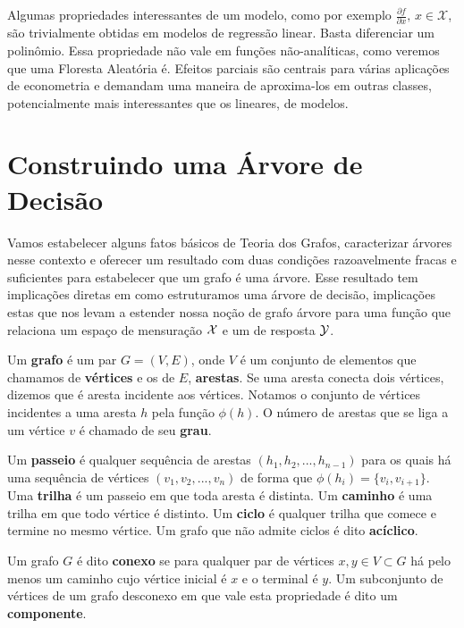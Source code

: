 Algumas propriedades interessantes de um modelo, como por exemplo $\frac{\partial f}{\partial x}, \, x \in \mathcal{X}$, são trivialmente obtidas em modelos de regressão linear. Basta diferenciar um polinômio. Essa propriedade não vale em funções não-analíticas, como veremos que uma Floresta Aleatória é. Efeitos parciais são centrais para várias aplicações de econometria e demandam uma maneira de aproxima-los em outras classes, potencialmente mais interessantes que os lineares, de modelos.

\section{Construindo uma Árvore de Decisão}

Vamos estabelecer alguns fatos básicos de Teoria dos Grafos, caracterizar árvores nesse contexto e oferecer um resultado com duas condições razoavelmente fracas e suficientes para estabelecer que um grafo é uma árvore. Esse resultado tem implicações diretas em como estruturamos uma árvore de decisão, implicações estas que nos levam a estender nossa noção de grafo árvore para uma função que relaciona um espaço de mensuração $\mathcal{X}$ e um de resposta $\mathcal{Y}$.

\begin{defi}
Um \textbf{grafo} é um par $G = (V, E)$, onde $V$ é um conjunto de elementos que chamamos de \textbf{vértices} e os de $E$, \textbf{arestas}. Se uma aresta conecta dois vértices, dizemos que é aresta incidente aos vértices. Notamos o conjunto de vértices incidentes a uma aresta $h$ pela função $\phi(h)$. O número de arestas que se liga a um vértice $v$ é chamado de seu \textbf{grau}.
\end{defi}

\begin{defi}
Um \textbf{passeio} é qualquer sequência de arestas $(h_1, h_2, ..., h_{n-1})$ para os quais há uma sequência de vértices $(v_1, v_2, ..., v_n)$ de forma que $\phi(h_i) = \{v_i, v_{i+1}\}$. Uma \textbf{trilha} é um passeio em que toda aresta é distinta. Um \textbf{caminho} é uma trilha em que todo vértice é distinto. Um \textbf{ciclo} é qualquer trilha que comece e termine no mesmo vértice. Um grafo que não admite ciclos é dito \textbf{acíclico}.
\end{defi}

\begin{defi}
Um grafo $G$ é dito \textbf{conexo} se para qualquer par de vértices $x, y \in V \subset G$ há pelo menos um caminho cujo vértice inicial é $x$ e o terminal é $y$. Um subconjunto de vértices de um grafo desconexo em que vale esta propriedade é dito um \textbf{componente}.
\end{defi}



